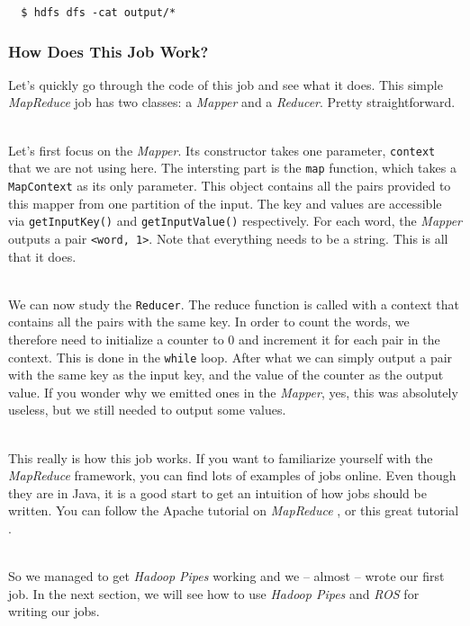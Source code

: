 \documentclass[a4paper, 12pt]{article}
\begin{document}
\begin{verbatim}
  $ hdfs dfs -cat output/*
\end{verbatim}

    \subsubsection{How Does This Job Work?}
  
Let's quickly go through the code of this job and see what it does. This simple \textit{MapReduce} job has two classes: a \textit{Mapper} and a \textit{Reducer}. Pretty straightforward.

~\\
Let's first focus on the \textit{Mapper}. Its constructor takes one parameter, \texttt{context} that we are not using here. The intersting part is the \texttt{map} function, which takes a \texttt{MapContext} as its only parameter. This object contains all the pairs provided to this mapper from one partition of the input. The key and values are accessible via \texttt{getInputKey()} and \texttt{getInputValue()} respectively. For each word, the \textit{Mapper} outputs a pair \texttt{<word, 1>}. Note that everything needs to be a string. This is all that it does.

~\\
We can now study the \texttt{Reducer}. The reduce function is called with a context that contains all the pairs with the same key. In order to count the words, we therefore need to initialize a counter to 0 and increment it for each pair in the context. This is done in the \texttt{while} loop. After what we can simply output a pair with the same key as the input key, and the value of the counter as the output value. If you wonder why we emitted ones in the \textit{Mapper}, yes, this was absolutely useless, but we still needed to output some values.

~\\
This really is how this job works. If you want to familiarize yourself with the \textit{MapReduce} framework, you can find lots of examples of jobs online. Even though they are in Java, it is a good start to get an intuition of how jobs should be written. You can follow the Apache tutorial on \textit{MapReduce} \cite{hadoop_mapreduce_tutorial}, or this great tutorial \cite{slideshare_tuto}.

~\\
So we managed to get \textit{Hadoop Pipes} working and we -- almost -- wrote our first job. In the next section, we will see how to use \textit{Hadoop Pipes} and \textit{ROS} for writing our jobs.
\end{document}
